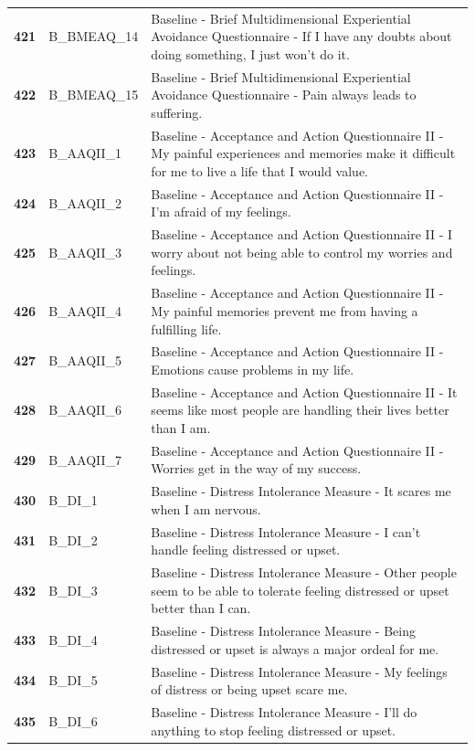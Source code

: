 \documentclass[
  letterpaper,
  DIV=11,
  numbers=noendperiod]{scrartcl}
\begin{document}
\begin{longtable}[t]{>{}cll}
\textbf{421} & B\_BMEAQ\_14 & Baseline - Brief Multidimensional Experiential Avoidance Questionnaire - If I have any doubts about doing something, I just won’t do it.\\
\textbf{422} & B\_BMEAQ\_15 & Baseline - Brief Multidimensional Experiential Avoidance Questionnaire - Pain always leads to suffering.\\
\textbf{423} & B\_AAQII\_1 & Baseline - Acceptance and Action Questionnaire II - My painful experiences and memories make it difficult for me to live a life that I would value.\\
\textbf{424} & B\_AAQII\_2 & Baseline - Acceptance and Action Questionnaire II - I’m afraid of my feelings.\\
\textbf{425} & B\_AAQII\_3 & Baseline - Acceptance and Action Questionnaire II - I worry about not being able to control my worries and feelings.\\
\addlinespace
\textbf{426} & B\_AAQII\_4 & Baseline - Acceptance and Action Questionnaire II - My painful memories prevent me from having a fulfilling life.\\
\textbf{427} & B\_AAQII\_5 & Baseline - Acceptance and Action Questionnaire II - Emotions cause problems in my life.\\
\textbf{428} & B\_AAQII\_6 & Baseline - Acceptance and Action Questionnaire II - It seems like most people are handling their lives better than I am.\\
\textbf{429} & B\_AAQII\_7 & Baseline - Acceptance and Action Questionnaire II - Worries get in the way of my success.\\
\textbf{430} & B\_DI\_1 & Baseline - Distress Intolerance Measure - It scares me when I am nervous.\\
\addlinespace
\textbf{431} & B\_DI\_2 & Baseline - Distress Intolerance Measure - I can't handle feeling distressed or upset.\\
\textbf{432} & B\_DI\_3 & Baseline - Distress Intolerance Measure - Other people seem to be able to tolerate feeling distressed or upset better than I can.\\
\textbf{433} & B\_DI\_4 & Baseline - Distress Intolerance Measure - Being distressed or upset is always a major ordeal for me.\\
\textbf{434} & B\_DI\_5 & Baseline - Distress Intolerance Measure - My feelings of distress or being upset scare me.\\
\textbf{435} & B\_DI\_6 & Baseline - Distress Intolerance Measure - I'll do anything to stop feeling distressed or upset.\\

\end{longtable}
\end{document}
